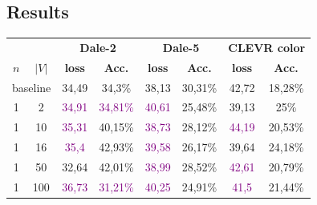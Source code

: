 \subsection*{Results}
\begin{table}[ht]
    \centering
    \begin{tabular}{cc|cc|cc|cc}
        \toprule
                                      &         & \multicolumn{2}{c}{\textbf{Dale-2}} & \multicolumn{2}{c}{\textbf{Dale-5}} & \multicolumn{2}{c}{\textbf{CLEVR color}}                                                                                         \\  \cmidrule(lr){3-4}\cmidrule(lr){5-6}\cmidrule(lr){7-8}
        $n$                           & $|V|$   & \textbf{loss}                       & \textbf{Acc.}                       & \textbf{loss}                            & \textbf{Acc.}               & \textbf{loss}             & \textbf{Acc.}               \\\midrule
        \multicolumn{2}{c|}{baseline} & {34,49} & {34,3\%}                            & {38,13}                             & {30,31\%}                                & {42,72}                     & {18,28\%}                                               \\\midrule
        {1}                           & {2}     & \textcolor{purple}{34,91}           & \textcolor{purple}{34,81\%}         & \textcolor{purple}{40,61}                & {25,48\%}                   & {39,13}                   & {25\%}                      \\
        {1}                           & {10}    & \textcolor{purple}{35,31}           & {40,15\%}                           & \textcolor{purple}{38,73}                & {28,12\%}                   & \textcolor{purple}{44,19} & {20,53\%}                   \\
        {1}                           & {16}    & \textcolor{purple}{35,4}            & {42,93\%}                           & \textcolor{purple}{39,58}                & {26,17\%}                   & {39,64}                   & {24,18\%}                   \\
        {1}                           & {50}    & {32,64}                             & {42,01\%}                           & \textcolor{purple}{38,99}                & {28,52\%}                   & \textcolor{purple}{42,61} & {20,79\%}                   \\
        {1}                           & {100}   & \textcolor{purple}{36,73}           & \textcolor{purple}{31,21\%}         & \textcolor{purple}{40,25}                & {24,91\%}                   & \textcolor{purple}{41,5}  & {21,44\%}                   \\

\end{tabular}
\end{table}
